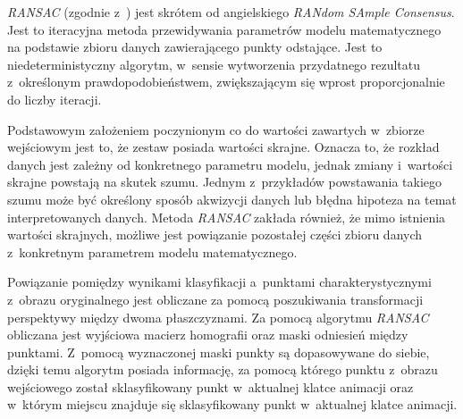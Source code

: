         \textit{RANSAC} (zgodnie z~\cite{Ransac}) jest skrótem od angielskiego \textit{RANdom SAmple Consensus}. Jest to iteracyjna metoda przewidywania parametrów modelu matematycznego na podstawie zbioru danych zawierającego punkty odstające. Jest to niedeterministyczny algorytm, w~sensie wytworzenia przydatnego rezultatu z~określonym prawdopodobieństwem, zwiększającym się wprost proporcjonalnie do liczby iteracji.

        Podstawowym założeniem poczynionym co do wartości zawartych w~zbiorze wejściowym jest to, że zestaw posiada wartości skrajne. Oznacza to, że rozkład danych jest zależny od konkretnego parametru modelu, jednak zmiany i~wartości skrajne powstają na skutek szumu. Jednym z~przykładów powstawania takiego szumu może być określony sposób akwizycji danych lub błędna hipoteza na temat interpretowanych danych. Metoda \textit{RANSAC} zakłada również, że mimo istnienia wartości skrajnych, możliwe jest powiązanie pozostałej części zbioru danych z~konkretnym parametrem modelu matematycznego.

        Powiązanie pomiędzy wynikami klasyfikacji a~punktami charakterystycznymi z~obrazu oryginalnego jest obliczane za pomocą poszukiwania transformacji perspektywy między dwoma płaszczyznami. Za pomocą algorytmu \textit{RANSAC} obliczana jest wyjściowa macierz homografii oraz maski odniesień między punktami. Z~pomocą wyznaczonej maski punkty są dopasowywane do siebie, dzięki temu algorytm posiada informację, za pomocą którego punktu z~obrazu wejściowego został sklasyfikowany punkt w~aktualnej klatce animacji oraz w~którym miejscu znajduje się sklasyfikowany punkt w~aktualnej klatce animacji.